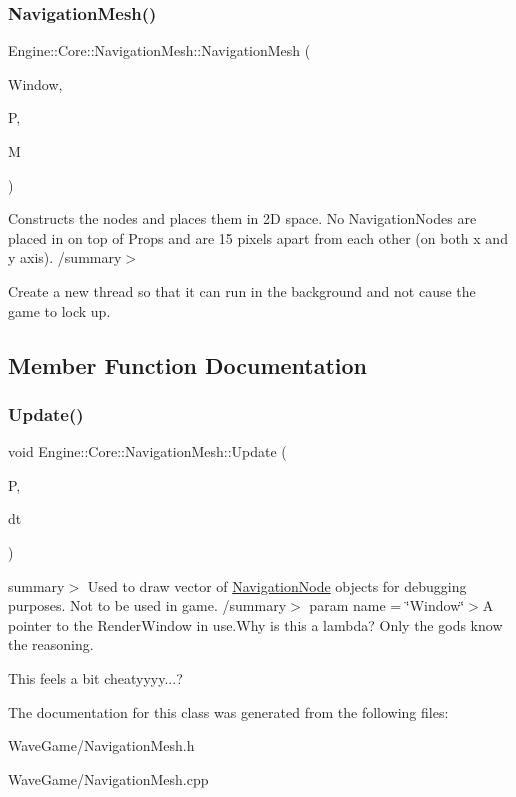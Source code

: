\subsubsection{\texorpdfstring{Navigation\+Mesh()}{NavigationMesh()}}
{\footnotesize\ttfamily Engine\+::\+Core\+::\+Navigation\+Mesh\+::\+Navigation\+Mesh (\begin{DoxyParamCaption}\item[{shared\+\_\+ptr$<$ Render\+Window $>$}]{Window,  }\item[{\hyperlink{class_engine_1_1_game_play_1_1_player}{Player}}]{P,  }\item[{\hyperlink{class_engine_1_1_core_1_1_map}{Map}}]{M }\end{DoxyParamCaption})}



Constructs the nodes and places them in 2D space. No Navigation\+Nodes are placed in on top of Props and are 15 pixels apart from each other (on both x and y axis). /summary$>$ 

Create a new thread so that it can run in the background and not cause the game to lock up. 

\subsection{Member Function Documentation}
\mbox{\label{class_engine_1_1_core_1_1_navigation_mesh_a5f2b7d3b8c7e5ea747f9d8a7c5b432e5}} 
\subsubsection{\texorpdfstring{Update()}{Update()}}
{\footnotesize\ttfamily void Engine\+::\+Core\+::\+Navigation\+Mesh\+::\+Update (\begin{DoxyParamCaption}\item[{\hyperlink{class_engine_1_1_game_play_1_1_player}{Player}}]{P,  }\item[{float}]{dt }\end{DoxyParamCaption})}

summary$>$ Used to draw vector of \hyperlink{struct_engine_1_1_core_1_1_navigation_node}{Navigation\+Node} objects for debugging purposes. Not to be used in game. /summary$>$ param name = \char`\"{}\+Window\char`\"{}$>$A pointer to the Render\+Window in use.Why is this a lambda? Only the gods know the reasoning.

This feels a bit cheatyyyy...? 

The documentation for this class was generated from the following files\+:\begin{DoxyCompactItemize}
\item 
Wave\+Game/Navigation\+Mesh.\+h\item 
Wave\+Game/Navigation\+Mesh.\+cpp\end{DoxyCompactItemize}
